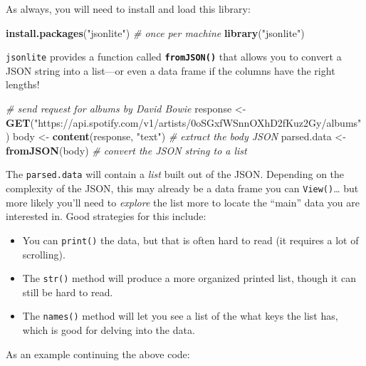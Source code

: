 \documentclass[]{book}
\newenvironment{Shaded}{\begin{snugshade}}{\end{snugshade}}
\newcommand{\KeywordTok}[1]{\textcolor[rgb]{0.13,0.29,0.53}{\textbf{#1}}}
\newcommand{\StringTok}[1]{\textcolor[rgb]{0.31,0.60,0.02}{#1}}
\newcommand{\CommentTok}[1]{\textcolor[rgb]{0.56,0.35,0.01}{\textit{#1}}}
\newcommand{\NormalTok}[1]{#1}
\providecommand{\tightlist}{%
  \setlength{\itemsep}{0pt}\setlength{\parskip}{0pt}}
\theoremstyle{definition}
\theoremstyle{definition}
\theoremstyle{remark}
\begin{document}
As always, you will need to install and load this library:

\begin{Shaded}
\begin{Highlighting}[]
\KeywordTok{install.packages}\NormalTok{(}\StringTok{"jsonlite"}\NormalTok{)  }\CommentTok{# once per machine}
\KeywordTok{library}\NormalTok{(}\StringTok{"jsonlite"}\NormalTok{)}
\end{Highlighting}
\end{Shaded}

\texttt{jsonlite} provides a function called
\textbf{\texttt{fromJSON()}} that allows you to convert a JSON string
into a list---or even a data frame if the columns have the right
lengths!

\begin{Shaded}
\begin{Highlighting}[]
\CommentTok{# send request for albums by David Bowie}
\NormalTok{response <-}\StringTok{ }\KeywordTok{GET}\NormalTok{(}\StringTok{"https://api.spotify.com/v1/artists/0oSGxfWSnnOXhD2fKuz2Gy/albums"}\NormalTok{)}
\NormalTok{body <-}\StringTok{ }\KeywordTok{content}\NormalTok{(response, }\StringTok{"text"}\NormalTok{)  }\CommentTok{# extract the body JSON}
\NormalTok{parsed.data <-}\StringTok{ }\KeywordTok{fromJSON}\NormalTok{(body)  }\CommentTok{# convert the JSON string to a list}
\end{Highlighting}
\end{Shaded}

The \texttt{parsed.data} will contain a \emph{list} built out of the
JSON. Depending on the complexity of the JSON, this may already be a
data frame you can \texttt{View()}\ldots{} but more likely you'll need
to \emph{explore} the list more to locate the ``main'' data you are
interested in. Good strategies for this include:

\begin{itemize}
\tightlist
\item
  You can \texttt{print()} the data, but that is often hard to read (it
  requires a lot of scrolling).
\item
  The \texttt{str()} method will produce a more organized printed list,
  though it can still be hard to read.
\item
  The \texttt{names()} method will let you see a list of the what keys
  the list has, which is good for delving into the data.
\end{itemize}

As an example continuing the above code:
\end{document}
